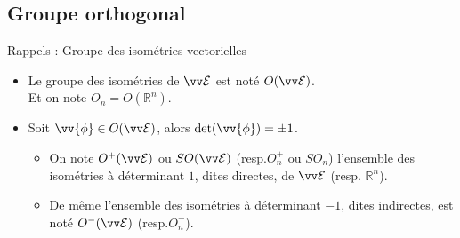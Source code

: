 \documentclass[bigger]{m53beamer}
\begin{document}
\subsection{Groupe orthogonal}
\begin{frame}{Rappels : Groupe des isométries vectorielles}
  \begin{itemize}[<+(1)->]
    \item Le \alert{groupe des isométries} de $\ev{E}$ est noté $O(\ev{E})$.\\
      Et on note $O_{n} = O(\mathbb{R}^{n})$.\pause\\
    \item Soit $\vv{\phi} \in O(\ev{E})$, alors $\det(\vv{\phi}) = \pm 1$.
      \begin{itemize}[<+(1)->]
        \item On note $O^{+}(\ev{E})$ ou $SO(\ev{E})$ (resp.$O_{n}^{+}$ ou $SO_{n}$) l'ensemble des isométries à déterminant $1$, dites \alert{directes}, de $\ev{E}$ (resp. $\mathbb{R}^{n}$).
        \item De même l'ensemble des isométries à déterminant $-1$, dites \alert{indirectes}, est noté $O^{-}(\ev{E})$ (resp.$O_{n}^{-}$).
      \end{itemize}\pause
  \end{itemize}
\end{frame}

\end{document}
